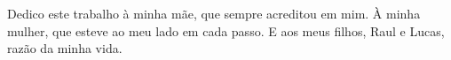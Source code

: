 Dedico este trabalho à minha mãe, que sempre acreditou em mim. À minha mulher, que esteve ao meu lado em cada passo. E aos meus filhos, Raul e Lucas, razão da minha vida.
